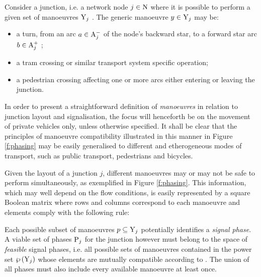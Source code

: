 Consider a junction, i.e. a network node $j \in \mathrm{N}$ where it is possible to perform a given set of manoeuvres $\mathrm{Y}_j$ .
The generic manoeuvre $y \in \mathrm{Y}_j$ may be:
\begin{itemize}
\item a turn, from an arc $ a \in \mathrm{A}_j^- $ of the node's backward star, to a forward star arc $b \in \mathrm{A}_j^+$ ;
\item a tram crossing or similar transport system specific operation;
\item a pedestrian crossing affecting one or more arcs either entering or leaving the junction.
\end{itemize}

In order to present a straightforward definition of \emph{manoeuvres} in relation to junction layout and signalisation, the focus will henceforth be on the movement of private vehicles only, unless otherwise specified.
It shall be clear that the principles of manoeuvre compatibility illustrated in this manner in Figure \ref{f:phasing} may be easily generalised to different and etherogeneous modes of transport, such as public transport, pedestrians and bicycles.


Given the layout of a junction $j$, different manoeuvres may or may not
be safe to perform simultaneously, as exemplified in Figure \ref{f:phasing}.
This information, which may well depend on the flow conditions, is easily represented by a square Boolean matrix where rows and columns correspond to each manoeuvre and elements comply with the following rule:


Each possible subset of manoeuvres $p \subseteq \mathrm{Y}_j$ potentially identifies a \emph{signal phase}.
A viable set of phases $\mathrm{P}_j$ for the junction however must belong to the space of \emph{feasible} signal phases, i.e. all possible sets of manoeuvres contained in the power set $ \wp \left( \mathrm{Y}_j \right)$ whose elements are mutually compatible according to .
The union of all phases must also include every available manoeuvre at least once.

